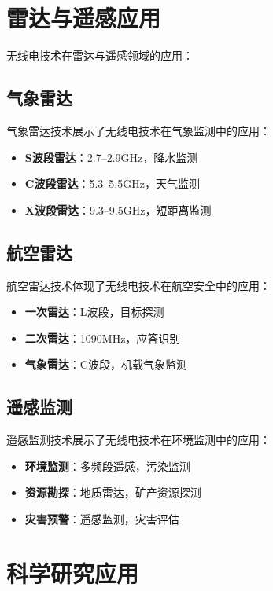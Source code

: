 \documentclass[12pt,UTF8]{ctexbook}
\begin{document}
\section{雷达与遥感应用}

无线电技术在雷达与遥感领域的应用：

\subsection{气象雷达}

气象雷达技术展示了无线电技术在气象监测中的应用：

\begin{itemize}[leftmargin=3.5em]
    \item \textbf{S波段雷达}：2.7--2.9GHz，降水监测
    \item \textbf{C波段雷达}：5.3--5.5GHz，天气监测
    \item \textbf{X波段雷达}：9.3--9.5GHz，短距离监测
\end{itemize}

\subsection{航空雷达}

航空雷达技术体现了无线电技术在航空安全中的应用：

\begin{itemize}[leftmargin=3.5em]
    \item \textbf{一次雷达}：L波段，目标探测
    \item \textbf{二次雷达}：1090MHz，应答识别
    \item \textbf{气象雷达}：C波段，机载气象监测
\end{itemize}

\subsection{遥感监测}

遥感监测技术展示了无线电技术在环境监测中的应用：

\begin{itemize}[leftmargin=3.5em]
    \item \textbf{环境监测}：多频段遥感，污染监测
    \item \textbf{资源勘探}：地质雷达，矿产资源探测
    \item \textbf{灾害预警}：遥感监测，灾害评估
\end{itemize}

\section{科学研究应用}
\end{document}
